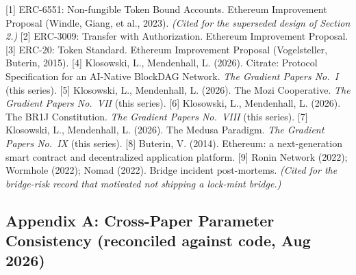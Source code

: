 {[}1{]} ERC-6551: Non-fungible Token Bound Accounts. Ethereum
Improvement Proposal (Windle, Giang, et al., 2023). \emph{(Cited for the
superseded design of Section 2.)} {[}2{]} ERC-3009: Transfer with
Authorization. Ethereum Improvement Proposal. {[}3{]} ERC-20: Token
Standard. Ethereum Improvement Proposal (Vogelsteller, Buterin, 2015).
{[}4{]} Klosowski, L., Mendenhall, L. (2026). Citrate: Protocol
Specification for an AI-Native BlockDAG Network. \emph{The Gradient
Papers No.~I} (this series). {[}5{]} Klosowski, L., Mendenhall, L.
(2026). The Mozi Cooperative. \emph{The Gradient Papers No.~VII} (this
series). {[}6{]} Klosowski, L., Mendenhall, L. (2026). The BR1J
Constitution. \emph{The Gradient Papers No.~VIII} (this series). {[}7{]}
Klosowski, L., Mendenhall, L. (2026). The Medusa Paradigm. \emph{The
Gradient Papers No.~IX} (this series). {[}8{]} Buterin, V. (2014).
Ethereum: a next-generation smart contract and decentralized application
platform. {[}9{]} Ronin Network (2022); Wormhole (2022); Nomad (2022).
Bridge incident post-mortems. \emph{(Cited for the bridge-risk record
that motivated not shipping a lock-mint bridge.)}

\subsection{Appendix A: Cross-Paper Parameter Consistency (reconciled
against code, Aug
2026)}\label{appendix-a-cross-paper-parameter-consistency-reconciled-against-code-aug-2026}


